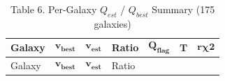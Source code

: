 \begin{longtable}[]{@{}
  >{\raggedright\arraybackslash}p{}
  >{\raggedright\arraybackslash}p{}
  >{\raggedright\arraybackslash}p{}
  >{\raggedright\arraybackslash}p{}
  >{\raggedright\arraybackslash}p{}
  >{\raggedright\arraybackslash}p{}
  >{\raggedright\arraybackslash}p{}@{}}
\caption{\protect{}\label{_Toc222952636}{}Table 6. Per-Galaxy \(Q_{est}\) / \(Q_{best}\) Summary (175 galaxies)}\tabularnewline
\toprule\noalign{}
\begin{minipage}[b]{\linewidth}\centering
Galaxy
\end{minipage} & \begin{minipage}[b]{\linewidth}\centering
\[\mathbf{v}_{\mathbf{best}}\]
\end{minipage} & \begin{minipage}[b]{\linewidth}\centering
\[\mathbf{v}_{\mathbf{est}}\]
\end{minipage} & \begin{minipage}[b]{\linewidth}\centering
Ratio
\end{minipage} & \begin{minipage}[b]{\linewidth}\centering
\[\mathbf{Q}_{\mathbf{flag}}\]
\end{minipage} & \begin{minipage}[b]{\linewidth}\centering
\[\mathbf{T}\]
\end{minipage} & \begin{minipage}[b]{\linewidth}\centering
\[\mathbf{r}\mathbf{\chi 2}\]
\end{minipage} \\
\midrule\noalign{}
\endfirsthead
\toprule\noalign{}
\begin{minipage}[b]{\linewidth}\centering
Galaxy
\end{minipage} & \begin{minipage}[b]{\linewidth}\centering
\[\mathbf{v}_{\mathbf{best}}\]
\end{minipage} & \begin{minipage}[b]{\linewidth}\centering
\[\mathbf{v}_{\mathbf{est}}\]
\end{minipage} & \begin{minipage}[b]{\linewidth}\centering
Ratio
\end{minipage} & \begin{minipage}[b]{\linewidth}\centering

\end{minipage}
\end{longtable}
